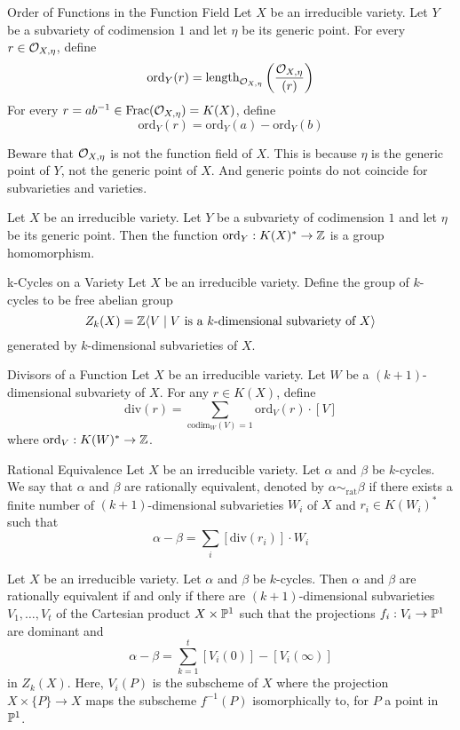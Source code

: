 \documentclass[a4paper]{article}
\begin{document}
\begin{defn}{Order of Functions in the Function Field}{} Let $X$ be an irreducible variety. Let $Y$ be a subvariety of codimension $1$ and let $\eta$ be its generic point. For every $r\in\mathcal{O}_{X,\eta}$, define $$\text{ord}_Y(r)=\text{length}_{\mathcal{O}_{X,\eta}}\left(\frac{\mathcal{O}_{X,\eta}}{(r)}\right)$$ For every $r=ab^{-1}\in\text{Frac}(\mathcal{O}_{X,\eta})=K(X)$, define $$\text{ord}_Y(r)=\text{ord}_Y(a)-\text{ord}_Y(b)$$
\end{defn}

Beware that $\mathcal{O}_{X,\eta}$ is not the function field of $X$. This is because $\eta$ is the generic point of $Y$, not the generic point of $X$. And generic points do not coincide for subvarieties and varieties. 

\begin{lmm}{}{} Let $X$ be an irreducible variety. Let $Y$ be a subvariety of codimension $1$ and let $\eta$ be its generic point. Then the function $\text{ord}_Y:K(X)^\ast\to\mathbb{Z}$ is a group homomorphism. 
\end{lmm}

\begin{defn}{k-Cycles on a Variety}{} Let $X$ be an irreducible variety. Define the group of $k$-cycles to be free abelian group $$Z_k(X)=\mathbb{Z}\langle V\;|\;V\text{ is a }k\text{-dimensional subvariety of }X\rangle$$ generated by $k$-dimensional subvarieties of $X$. 
\end{defn}

\begin{defn}{Divisors of a Function}{} Let $X$ be an irreducible variety. Let $W$ be a $(k+1)$-dimensional subvariety of $X$. For any $r\in K(X)$, define $$\text{div}(r)=\sum_{\text{codim}_W(V)=1}\text{ord}_V(r)\cdot[V]$$ where $\text{ord}_V:K(W)^\ast\to\mathbb{Z}$. 
\end{defn}

\begin{defn}{Rational Equivalence}{} Let $X$ be an irreducible variety. Let $\alpha$ and $\beta$ be $k$-cycles. We say that $\alpha$ and $\beta$ are rationally equivalent, denoted by $\alpha\sim_{\text{rat}}\beta$ if there exists a finite number of $(k+1)$-dimensional subvarieties $W_i$ of $X$ and $r_i\in K(W_i)^\ast$ such that $$\alpha-\beta=\sum_i[\text{div}(r_i)]\cdot W_i$$
\end{defn}

\begin{thm}{}{} Let $X$ be an irreducible variety. Let $\alpha$ and $\beta$ be $k$-cycles. Then $\alpha$ and $\beta$ are rationally equivalent if and only if there are $(k+1)$-dimensional subvarieties $V_1,\dots,V_t$ of the Cartesian product $X\times\mathbb{P}^1$ such that the projections $f_i:V_i\to\mathbb{P}^1$ are dominant and $$\alpha-\beta=\sum_{k=1}^t[V_i(0)]-[V_i(\infty)]$$ in $Z_k(X)$. Here, $V_i(P)$ is the subscheme of $X$ where the projection $X\times\{P\}\to X$ maps the subscheme $f^{-1}(P)$ isomorphically to, for $P$ a point in $\mathbb{P}^1$. 
\end{thm}
\end{document}

